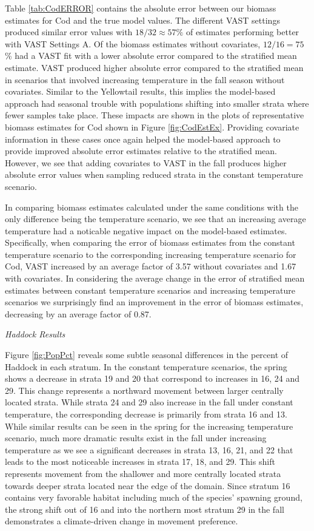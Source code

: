 \documentclass[
  12pt,
]{article}
\begin{document}
Table \ref{tab:CodERROR} contains the absolute error between our biomass estimates for Cod and the true model values. The different VAST settings produced similar error values with \(18/32\approx57\%\) of estimates performing better with VAST Settings A. Of the biomass estimates without covariates, \(12/16=75\)\% had a VAST fit with a lower absolute error compared to the stratified mean estimate. VAST produced higher absolute error compared to the stratified mean in scenarios that involved increasing temperature in the fall season without covariates. Similar to the Yellowtail results, this implies the model-based approach had seasonal trouble with populations shifting into smaller strata where fewer samples take place. These impacts are shown in the plots of representative biomass estimates for Cod shown in Figure \ref{fig:CodEstEx}. Providing covariate information in these cases once again helped the model-based approach to provide improved absolute error estimates relative to the stratified mean. However, we see that adding covariates to VAST in the fall produces higher absolute error values when sampling reduced strata in the constant temperature scenario.

In comparing biomass estimates calculated under the same conditions with the only difference being the temperature scenario, we see that an increasing average temperature had a noticable negative impact on the model-based estimates. Specifically, when comparing the error of biomass estimates from the constant temperature scenario to the corresponding increasing temperature scenario for Cod, VAST increased by an average factor of 3.57 without covariates and 1.67 with covariates. In considering the average change in the error of stratified mean estimates between constant temperature scenarios and increasing temperature scenarios we surprisingly find an improvement in the error of biomass estimates, decreasing by an average factor of 0.87.

\emph{Haddock Results}

Figure \ref{fig:PopPct} reveals some subtle seasonal differences in the percent of Haddock in each stratum. In the constant temperature scenarios, the spring shows a decrease in strata 19 and 20 that correspond to increases in 16, 24 and 29. This change represents a northward movement between larger centrally located strata. While strata 24 and 29 also increase in the fall under constant temperature, the corresponding decrease is primarily from strata 16 and 13. While similar results can be seen in the spring for the increasing temperature scenario, much more dramatic results exist in the fall under increasing temperature as we see a significant decreases in strata 13, 16, 21, and 22 that leads to the most noticeable increases in strata 17, 18, and 29. This shift represents movement from the shallower and more centrally located strata towards deeper strata located near the edge of the domain. Since stratum 16 contains very favorable habitat including much of the species' spawning ground, the strong shift out of 16 and into the northern most stratum 29 in the fall demonstrates a climate-driven change in movement preference.
\end{document}
